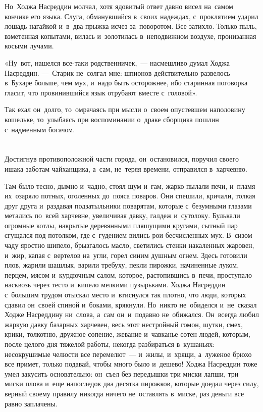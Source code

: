 \documentclass[12pt,a4paper]{book}
\begin{document}
Но~Ходжа Насреддин молчал, хотя ядовитый ответ давно висел на~самом кончике его языка. Слуга, обманувшийся в~своих надеждах, с~проклятием ударил лошадь нагайкой и~в~два прыжка исчез за~поворотом. Все затихло. Только пыль, взметенная копытами, вилась и~золотилась в~неподвижном воздухе, пронизанная косыми лучами.

«Ну~вот, нашелся все-таки родственничек,~— насмешливо думал Ходжа Насреддин. —~Старик не~солгал мне: шпионов действительно развелось в~Бухаре больше, чем мух, и~надо быть осторожнее, ибо старинная поговорка гласит, что провинившийся язык отрубают вместе с~головой».

Так ехал он~долго, то~омрачаясь при мысли о~своем опустевшем наполовину кошельке, то~улыбаясь при воспоминании о~драке сборщика пошлин с~надменным богачом.


\chapter{}

Достигнув противоположной части города, он~остановился, поручил своего ишака заботам чайханщика, а~сам, не~теряя времени, отправился в~харчевню.

Там было тесно, дымно и~чадно, стоял шум и~гам, жарко пылали печи, и~пламя их~озаряло потных, оголенных до~пояса поваров. Они спешили, кричали, толкая друг друга и~раздавая подзатыльники поварятам, которые с~безумными глазами метались по~всей харчевне, увеличивая давку, галдеж и~сутолоку. Булькали огромные котлы, накрытые деревянными пляшущими кругами, сытный пар сгущался под потолком, где с~гудением вились рои бесчисленных мух. В~сизом чаду яростно шипело, брызгалось масло, светились стенки накаленных жаровен, и~жир, капая с~вертелов на~угли, горел синим душным огнем. Здесь готовили плов, жарили шашлык, варили требуху, пекли пирожки, начиненные луком, перцем, мясом и~курдючным салом, которое, растопившись в~печи, проступало насквозь через тесто и~кипело мелкими пузырьками. Ходжа Насреддин с~большим трудом отыскал место и~втиснулся так плотно, что люди, которых сдавил он~своей спиной и~боками, крякнули. Но~никто не~обиделся и~не~сказал Ходже Насреддину ни~слова, а~сам он~и~подавно не~обижался. Он~всегда любил жаркую давку базарных харчевен, весь этот нестройный гомон, шутки, смех, крики, толкотню, дружное сопение, жевание и~чавканье сотен людей, которым, после целого дня тяжелой работы, некогда разбираться в~кушаньях: несокрушимые челюсти все перемелют~— и~жилы, и~хрящи, а~луженое брюхо все примет, только подавай, чтобы много было и~дешево! Ходжа Насреддин тоже умел закусить основательно: он~съел без передышки три миски лапши, три миски плова и~еще напоследок два десятка пирожков, которые доедал через силу, верный своему правилу никогда ничего не~оставлять в~миске, раз деньги все равно заплачены.
\end{document}
